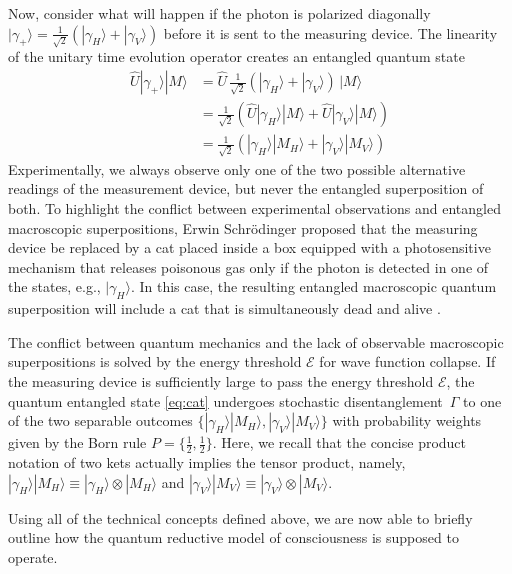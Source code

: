 \documentclass{ws-ijmpb}
\begin{document}
\begin{example}
Now, consider what will happen if the photon is polarized diagonally
$|\gamma_{+}\rangle=\frac{1}{\sqrt{2}}(|\gamma_{H}\rangle+|\gamma_{V}\rangle)$
before it is sent to the measuring device. The linearity of the unitary
time evolution operator creates an entangled quantum state
\begin{align}
\hat{U}|\gamma_{+}\rangle|M\rangle & =\hat{U}\,\frac{1}{\sqrt{2}}(|\gamma_{H}\rangle+|\gamma_{V}\rangle)\,|M\rangle\nonumber \\
 & =\frac{1}{\sqrt{2}}(\hat{U}|\gamma_{H}\rangle|M\rangle+\hat{U}|\gamma_{V}\rangle|M\rangle)\nonumber \\
 & =\frac{1}{\sqrt{2}}(|\gamma_{H}\rangle|M_{H}\rangle+|\gamma_{V}\rangle|M_{V}\rangle)\label{eq:cat}
\end{align}
Experimentally, we always observe only one of the two possible alternative
readings of the measurement device, but never the entangled superposition
of both. To highlight the conflict between experimental observations
and entangled macroscopic superpositions, Erwin Schr\"{o}dinger proposed
that the measuring device be replaced by a cat placed inside a box
equipped with a photosensitive mechanism that releases poisonous gas
only if the photon is detected in one of the states, e.g., $|\gamma_{H}\rangle$.
In this case, the resulting entangled macroscopic quantum superposition
will include a cat that is simultaneously dead and alive \cite{Schrodinger1935,Schrodinger1983}.

The conflict between quantum mechanics and the lack of observable
macroscopic superpositions is solved by the energy threshold $\mathscr{E}$
for wave function collapse. If the measuring device is sufficiently
large to pass the energy threshold $\mathscr{E}$, the quantum entangled
state \eqref{eq:cat} undergoes stochastic disentanglement~$\Gamma$
to one of the two separable outcomes $\{|\gamma_{H}\rangle|M_{H}\rangle,|\gamma_{V}\rangle|M_{V}\rangle\}$
with probability weights given by the Born rule $P=\{\frac{1}{2},\frac{1}{2}\}$.
Here, we recall that the concise product notation of two kets actually
implies the tensor product, namely, $|\gamma_{H}\rangle|M_{H}\rangle\equiv|\gamma_{H}\rangle\otimes|M_{H}\rangle$
and $|\gamma_{V}\rangle|M_{V}\rangle\equiv|\gamma_{V}\rangle\otimes|M_{V}\rangle$.
\end{example}

Using all of the technical concepts defined above, we are now able
to briefly outline how the quantum reductive model of consciousness
is supposed to operate.
\end{document}
